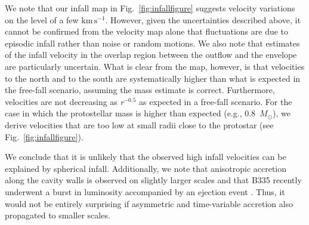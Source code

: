 \documentclass{aa}
\newcommand{\kmpers}{\ensuremath{\mathrm{km \, s^{-1}}}\xspace} %
\newcommand{\msun}{\ensuremath{M_{\odot}}\xspace}
\newcommand{\dhnote}[1]{ {\bf \color{red} [DH:~#1]}}
\newcommand{\pbnote}[1]{ {\color{orange} [PB:~#1]}}
\newcommand{\jprnote}[1]{ {\color{magenta} [JPR:~#1]}}
\begin{document}
We note that our infall map in Fig.~\ref{fig:infallfigure} suggests velocity variations on the level of a few \kmpers. However, given the uncertainties described above, it cannot be confirmed from the velocity map alone that fluctuations are due to episodic infall rather than noise or random motions. We also note that estimates of the infall velocity in the overlap region between the outflow and the envelope are particularly uncertain. What is clear from the map, however, is that velocities to the north and to the south are systematically higher than what is expected in the free-fall scenario, assuming the mass estimate is correct. Furthermore, velocities are not decreasing as \textit{r}$^{-0.5}$ as expected in a free-fall scenario. For the case in which the protostellar mass is higher than expected (e.g., 0.8~\msun), we derive velocities that are too low at small radii close to the protostar (see Fig.~\ref{fig:infallfigure}). %

We conclude that it is unlikely that the observed high infall velocities can be explained by spherical infall. Additionally, we note that anisotropic accretion along the cavity walls is observed on slightly larger scales \citet{Cabedo:2021hw} and that B335 recently underwent a burst in luminosity \citep{Evans:2023aa} accompanied by an ejection event \citep{Bjerkeli:2019ip}. Thus, it would not be entirely surprising if asymmetric and time-variable accretion also propagated to smaller scales.


\end{document}
